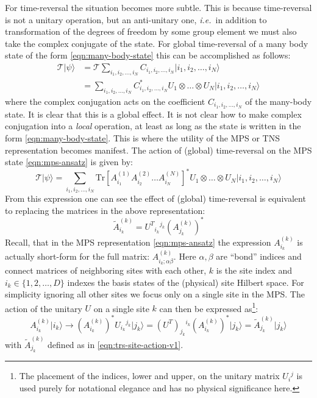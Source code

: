 \documentclass[preprint]{SciPost}
\newcommand{\ie}{\textit{i.e.}~}
\newcommand{\mc}[1]{\mathcal{#1}}
\newcommand{\ket}[1]{\vert #1 \rangle}
\newcommand{\Tr}{\mathrm{Tr}}
\theoremstyle{plain} %
\begin{document}
For time-reversal the situation becomes more subtle. This is because time-reversal is not a unitary operation, but an anti-unitary one, \ie in addition to transformation of the degrees of freedom by some group element we must also take the complex conjugate of the state. For global time-reversal of a many body state of the form \eqref{eqn:many-body-state} this can be accomplished as follows:
\begin{align}\label{eqn:psi-time-reversal}
	\mc{T} \ket{\psi} & = \mc{T} \sum_{i_1, i_2, \ldots, i_N} C_{i_1, i_2, \ldots, i_N} \ket{i_1, i_2, \ldots, i_N} \nonumber \\
	& = \sum_{i_1, i_2, \ldots, i_N} C^*_{i_1, i_2, \ldots, i_N} U_1 \otimes \ldots \otimes U_N  \ket{i_1, i_2, \ldots, i_N}
\end{align}
where the complex conjugation acts on the coefficient $ C_{i_1, i_2, \ldots, i_N} $ of the many-body state. It is clear that this is a global effect. It is not clear how to make complex conjugation into a \emph{local} operation, at least as long as the state is written in the form \eqref{eqn:many-body-state}. This is where the utility of the MPS or TNS representation becomes manifest. The action of (global) time-reversal on the MPS state \eqref{eqn:mps-ansatz} is given by:
\begin{equation}\label{eqn:mps-time-reversal}
	\mc{T} \ket{\psi} =  \sum_{i_1, i_2, \ldots, i_N} \Tr\left[ A^{(1)}_{i_1} A^{(2)}_{i_2} \ldots A^{(N)}_{i_N} \right]^* U_1 \otimes \ldots \otimes U_N  \ket{i_1, i_2, \ldots, i_N}
\end{equation}
From this expression one can see the effect of (global) time-reversal is equivalent to replacing the matrices in the above representation:
\begin{equation}\label{eqn:trs-site-action-v1}
	\tilde A^{(k)}_{i_k} = U^T{}_{i_k}{}^{j_k} (A^{(k)}_{j_k})^*
\end{equation}
Recall, that in the MPS representation \eqref{eqn:mps-ansatz} the expression $ A^{(k)}_{i_k} $ is actually short-form for the full matrix: $ A^{(k)}_{i_k;\alpha\beta} $. Here $ \alpha, \beta $ are ``bond'' indices and connect matrices of neighboring sites with each other, $ k $ is the site index and $ i_k \in \{1,2,\ldots,D\} $ indexes the basis states of the (physical) site Hilbert space. For simplicity ignoring all other sites we focus only on a single site in the MPS. The action of the unitary $ U $ on a single site $ k $ can then be expressed as\footnote{The placement of the indices, lower and upper, on the unitary matrix $ U_i{}^j $ is used purely for notational elegance and has no physical significance here.}:
\[ A^{(k)}_{i_k} \ket{i_k} \rightarrow \left(A^{(k)}_{i_k}\right)^* U_{i_k}{}^{j_k} \ket{j_k} = \left( U^T \right)_{j_k}{}^{i_k} \left(A^{(k)}_{i_k}\right)^* \ket{j_k} = \tilde A^{(k)}_{j_k} \ket{j_k}  \]
with $ \tilde A^{(k)}_{j_k} $ defined as in \eqref{eqn:trs-site-action-v1}.
\end{document}
